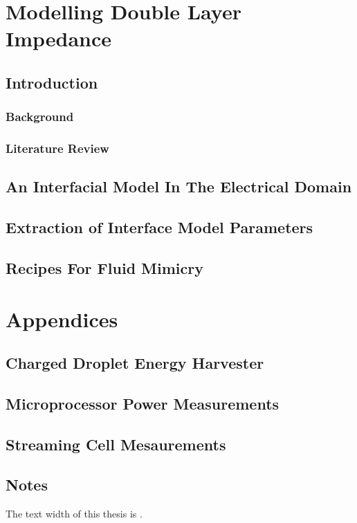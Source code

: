 \part{Modelling Double Layer Impedance}
  \label{part:doubleLayersOnConductors}
  \chapter{Introduction}
    \section{Background}
    \section{Literature Review}

  \chapter{An Interfacial Model In The Electrical Domain}
    

  \chapter{Extraction of Interface Model Parameters}
    

  \chapter{Recipes For Fluid Mimicry}
    

\part{Appendices}
  \appendix
  \chapter{Charged Droplet Energy Harvester}
    
  \chapter{Microprocessor Power Measurements}
    
  \chapter{Streaming Cell Mesaurements}
    

\chapter*{Notes}
The text width of this thesis is \the\textwidth.






